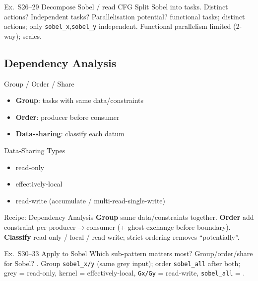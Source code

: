 \begin{example2}{Ex.\ S26--29 Decompose Sobel / read CFG}
    Split Sobel into tasks. Distinct actions? Independent tasks? Parallelisation potential?
     functional tasks;  distinct actions; only \texttt{sobel\_x},\texttt{sobel\_y} independent. Functional parallelism limited (2-way);  scales.
\end{example2}

\subsection{Dependency Analysis}


\begin{concept}{Group / Order / Share}
    \begin{itemize}
        \item \textbf{Group}: tasks with same data/constraints
        \item \textbf{Order}: producer before consumer
        \item \textbf{Data-sharing}: classify each datum
    \end{itemize}
\end{concept}

\begin{definition}{Data-Sharing Types}
    \begin{itemize}
        \item read-only
        \item effectively-local
        \item read-write (accumulate / multi-read-single-write)
    \end{itemize}
\end{definition}

\multend

\begin{KR}{Recipe: Dependency Analysis}
    \textbf{Group} same data/constraints together.
    \textbf{Order} add constraint per producer$\to$consumer (+ ghost-exchange before boundary).
    \textbf{Classify} read-only / local / read-write; strict ordering removes ``potentially''.
\end{KR}

\begin{example2}{Ex.\ S30--33 Apply to Sobel}
    Which sub-pattern matters most? Group/order/share for Sobel?
    \tcblower
    . Group \texttt{sobel\_x/y} (same grey input); order \texttt{sobel\_all} after both; grey = read-only, kernel = effectively-local, \texttt{Gx/Gy} = read-write, \texttt{sobel\_all} = .
\end{example2}

